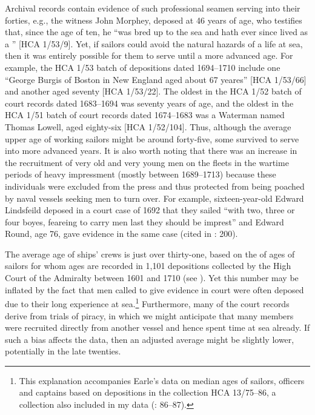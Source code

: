 Archival records contain evidence of such professional seamen serving into their forties, e.g., the witness John Morphey, deposed at 46 years of age, who testifies that, since the age of ten, he “was bred up to the sea and hath ever since lived as a ” [HCA 1/53/9]. Yet, if sailors could avoid the natural hazards of a life at sea, then it was entirely possible for them to serve until a more advanced age. For example, the HCA 1/53 batch of depositions dated 1694–1710 include one  “George Burgis of Boston in New England  aged about 67 yeares” [HCA 1/53/66] and another aged seventy [HCA 1/53/22]. The oldest  in the HCA 1/52 batch of court records dated 1683–1694 was seventy years of age, and the oldest  in the HCA 1/51 batch of court records dated 1674–1683 was a Waterman named Thomas Lowell, aged eighty-six [HCA 1/52/104]. Thus, although the average upper age of working sailors might be around forty-five, some survived to serve into more advanced years. It is also worth noting that there was an increase in the recruitment of very old and very young men on the  fleets in the wartime periods of heavy impressment (mostly between 1689–1713) because these individuals were excluded from the press and thus protected from being poached by naval vessels seeking men to turn over. For example, sixteen-year-old Edward Lindsfeild deposed in a court case of 1692 that they sailed “with two, three or four boyes, feareing to carry men last they should be imprest” and Edward Round, age 76, gave evidence in the same case (cited in \citealt{Earle1998}: 200). 

 The average age of ships’ crews is just over thirty-one, based on the of ages of sailors for whom ages are recorded in 1,101 depositions collected by the High Court of the Admiralty between 1601 and 1710 (see ). Yet this number may be inflated by the fact that men called to give evidence in court were often deposed due to their long experience at sea.\footnote{This explanation accompanies Earle’s data on median ages of sailors, officers and captains based on depositions in the collection HCA 13/75–86, a collection also included in my data (\citealt{Earle1993}: 86–87).} Furthermore, many of the court records derive from trials of piracy, in which we might anticipate that many  members were recruited directly from another vessel and hence spent time at sea already. If such a bias affects the data, then an adjusted average might be slightly lower, potentially in the late twenties.


